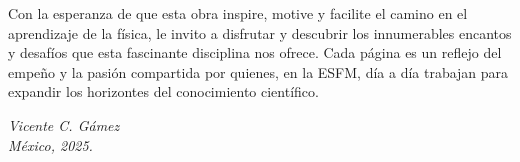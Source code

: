 Con la esperanza de que esta obra inspire, motive y facilite el camino en el aprendizaje de la física, le invito a disfrutar y descubrir los innumerables encantos y desafíos que esta fascinante disciplina nos ofrece. Cada página es un reflejo del empeño y la pasión compartida por quienes, en la ESFM, día a día trabajan para expandir los horizontes del conocimiento científico.

\vspace{2ex}

\begin{flushright}
    \cafe\selectfont\itshape Vicente C. Gámez \\
    México, 2025.
\end{flushright}